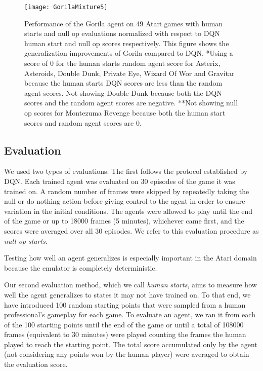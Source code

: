 \begin{figure*} [!ht]
	\vskip -0.1in
	\begin{center}
		\centerline{\texttt{[image: GorilaMixture5]}}
		\caption{Performance of the Gorila agent on 49 Atari games with human starts and null op evaluations normalized with respect to DQN human start and null op scores respectively. This figure shows the generalization improvements of Gorila compared to DQN. *Using a score of 0 for the human starts random agent score for Asterix, Asteroids, Double Dunk, Private Eye, Wizard Of Wor and Gravitar because the human starts DQN scores are less than the random agent scores. Not showing Double Dunk because both the DQN scores and the random agent scores are negative. **Not showing null op scores for Montezuma Revenge because both the human start scores and random agent scores are 0.
		}
		\label{fig:humanstarts1}
	\end{center}
	\vskip -0.2in
\end{figure*}

\subsection{Evaluation}

We used two types of evaluations.
The first follows the protocol established by DQN. Each trained agent was evaluated on 30 episodes of the game it was trained on.
A random  number of frames were skipped by repeatedly taking the null or do nothing action before giving control to the agent in order to ensure variation in the initial conditions.
The agents were allowed to play until the end of the game or up to 18000 frames (5 minutes), whichever came first, and the scores were averaged over all 30 episodes. We refer to this evaluation procedure as {\it null op starts}.

Testing how well an agent generalizes is especially important in the Atari domain because the emulator is completely deterministic.

Our second evaluation method, which we call {\it human starts}, aims to measure how well the agent generalizes to states it may not have trained on. To that end, we have introduced 100 random starting points that were sampled from a human professional's gameplay for each game.
To evaluate an agent, we ran it from each of the 100 starting points until the end of the game or until a total of 108000 frames (equivalent to 30 minutes) were played counting the frames the human played to reach the starting point.
The total score accumulated only by the agent (not considering any points won by the human player) were averaged to obtain the evaluation score.


